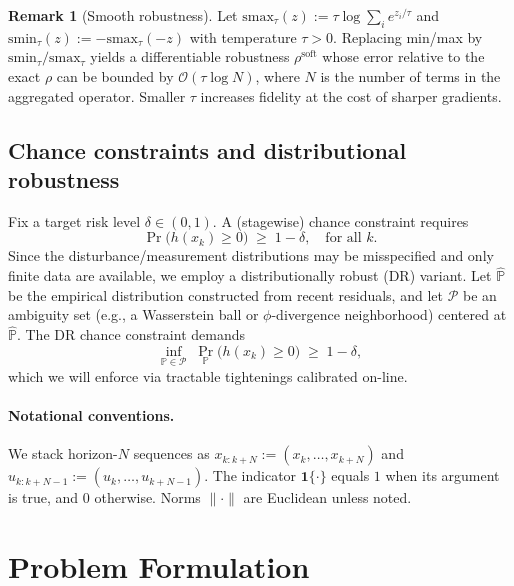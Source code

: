 \documentclass[journal]{IEEEtran}
\theoremstyle{definition}
\newtheorem{remark}{Remark}
\begin{document}
\begin{remark}[Smooth robustness]
\label{rem:smooth-robust}
Let $\mathrm{smax}_\tau(z):=\tau\log\!\sum_i e^{z_i/\tau}$ and
$\mathrm{smin}_\tau(z):=-\mathrm{smax}_\tau(-z)$ with temperature $\tau>0$.
Replacing min/max by $\mathrm{smin}_\tau/\mathrm{smax}_\tau$ yields a differentiable robustness
$\rho^{\text{soft}}$ whose error relative to the exact $\rho$ can be bounded by $\mathcal{O}(\tau\log N)$,
where $N$ is the number of terms in the aggregated operator. Smaller $\tau$ increases fidelity at
the cost of sharper gradients.
\end{remark}

\subsection{Chance constraints and distributional robustness}
Fix a target risk level $\delta\in(0,1)$. A (stagewise) chance constraint requires
\begin{equation}
  \Pr\big(h(x_k)\ge 0\big) \;\ge\; 1-\delta, \quad \text{for all } k.
  \label{eq:chance}
\end{equation}
Since the disturbance/measurement distributions may be misspecified and only finite data are
available, we employ a distributionally robust (DR) variant. Let $\widehat{\mathbb{P}}$ be the
empirical distribution constructed from recent residuals, and let $\mathcal{P}$ be an ambiguity
set (e.g., a Wasserstein ball or $\phi$-divergence neighborhood) centered at $\widehat{\mathbb{P}}$.
The DR chance constraint demands
\begin{equation}
  \inf_{\mathbb{P}\in\mathcal{P}} \;
  \Pr_{\mathbb{P}}\big(h(x_k)\ge 0\big) \;\ge\; 1-\delta,
  \label{eq:dr-chance}
\end{equation}
which we will enforce via tractable tightenings calibrated on-line.

\paragraph*{Notational conventions.}
We stack horizon-$N$ sequences as $x_{k:k+N} := (x_k,\dots,x_{k+N})$ and
$u_{k:k+N-1} := (u_k,\dots,u_{k+N-1})$. The indicator $\mathbf{1}\{\cdot\}$ equals $1$ when its
argument is true, and $0$ otherwise. Norms $\|\cdot\|$ are Euclidean unless noted.

\section{Problem Formulation}
\end{document}
